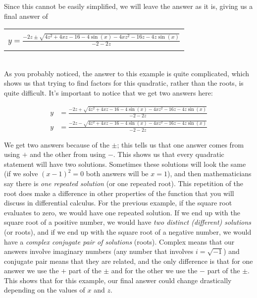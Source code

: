 {Since this cannot be easily simplified, we will leave the answer as it is, giving us a final answer of
	\begin{center}
		\begin{tabular}{| c |} \hline
			\\[-4pt]
			$\displaystyle y = \frac{-2z \pm \sqrt{ 4z^2+4xz-16-4 \sin{(x)} - 4xz^2-16z-4z \sin{(x)} }}{-2-2z}$ \\[-4pt]
			\\\hline
		\end{tabular}
	\end{center}}\\

As you probably noticed, the answer to this example is quite complicated, which shows us that trying to find factors for this quadratic, rather than the roots, is quite difficult. It's important to notice that we get two answers here:

\begin{equation*}
	\begin{split}
		y & = \frac{-2z + \sqrt{ 4z^2+4xz-16-4 \sin{(x)} - 4xz^2-16z-4z \sin{(x)} }}{-2-2z}\\[6pt]
		y & = \frac{-2z - \sqrt{ 4z^2+4xz-16-4 \sin{(x)} - 4xz^2-16z-4z \sin{(x)} }}{-2-2z}
	\end{split}
\end{equation*}

\noindent
We get two answers because of the $\pm$; this tells us that one answer comes from using $+$ and the other from using $-$. This shows us that every quadratic statement will have two solutions. Sometimes these solutions will look the same (if we solve $(x-1)^2 = 0$ both answers will be $x=1$), and then mathematicians say there is \emph{one repeated solution} (or one repeated root). This repetition of the root does make a difference in other properties of the function that you will discuss in differential calculus. For the previous example, if the square root evaluates to zero, we would have one repeated solution. If we end up with the square root of a positive number, we would have \emph{two distinct (different) solutions} (or roots), and if we end up with the square root of a negative number, we would have a \emph{complex conjugate pair of solutions} (roots). Complex means that our answers involve imaginary numbers (any number that involves $i=\sqrt{-1}$) and conjugate pair means that they are related, and the only difference is that for one answer we use the $+$ part of the $\pm$ and for the other we use the $-$ part of the $\pm$. This shows that for this example, our final answer could change drastically depending on the values of $x$ and $z$.

